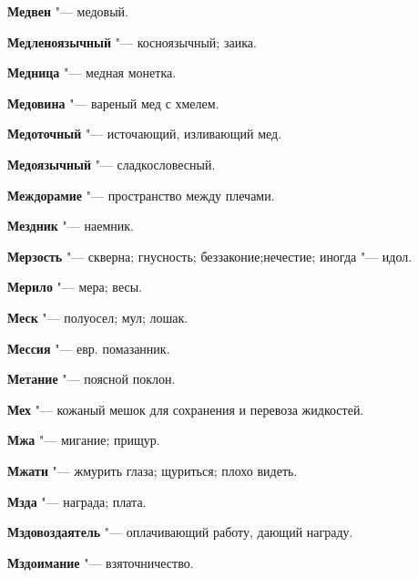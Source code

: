 \begin{mymulticols}{2}
\noindent\textbf{Медвен} "--- медовый. 




\noindent\textbf{Медленоязычный} "--- косноязычный; заика. 




\noindent\textbf{Медница} "--- медная монетка. 




\noindent\textbf{Медовина} "--- вареный мед с хмелем. 




\noindent\textbf{Медоточный} "--- источающий, изливающий мед. 




\noindent\textbf{Медоязычный} "--- сладкословесный. 




\noindent\textbf{Междорамие} "--- пространство между плечами. 




\noindent\textbf{Мездник} "--- наемник. 




\noindent\textbf{Мерзость} "--- скверна; гнусность; беззаконие;нечестие; иногда "--- идол. 




\noindent\textbf{Мерило} "--- мера; весы. 




\noindent\textbf{Меск} "--- полуосел; мул; лошак. 




\noindent\textbf{Мессия} "--- евр. помазанник. 




\noindent\textbf{Метание} "--- поясной поклон. 




\noindent\textbf{Мех} "--- кожаный мешок для сохранения и перевоза жидкостей. 




\noindent\textbf{Мжа} "--- мигание; прищур. 




\noindent\textbf{Мжати} "--- жмурить глаза; щуриться; плохо видеть. 




\noindent\textbf{Мзда} "--- награда; плата. 




\noindent\textbf{Мздовоздаятель} "--- оплачивающий работу, дающий награду. 




\noindent\textbf{Мздоимание} "--- взяточничество. 





\end{mymulticols}
